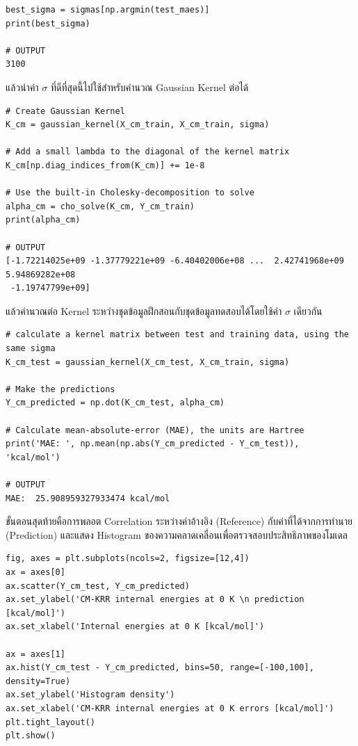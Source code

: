 \begin{lstlisting}[style=MyPython]
best_sigma = sigmas[np.argmin(test_maes)]
print(best_sigma)

# OUTPUT
3100
\end{lstlisting}

\noindent แล้วนำค่า $\sigma$ ที่ดีที่สุดนี้ไปใช้สำหรับคำนวณ Gaussian Kernel ต่อได้

\begin{lstlisting}[style=MyPython]
# Create Gaussian Kernel
K_cm = gaussian_kernel(X_cm_train, X_cm_train, sigma)

# Add a small lambda to the diagonal of the kernel matrix
K_cm[np.diag_indices_from(K_cm)] += 1e-8

# Use the built-in Cholesky-decomposition to solve
alpha_cm = cho_solve(K_cm, Y_cm_train)
print(alpha_cm)

# OUTPUT
[-1.72214025e+09 -1.37779221e+09 -6.40402006e+08 ...  2.42741968e+09  5.94869282e+08
 -1.19747799e+09]
\end{lstlisting}

\noindent แล้วคำนวณต่อ Kernel ระหว่างชุดข้อมูลฝึกสอนกับชุดข้อมูลทดสอบได้โดยใช้ค่า $\sigma$ เดียวกัน

\begin{lstlisting}[style=MyPython]
# calculate a kernel matrix between test and training data, using the same sigma
K_cm_test = gaussian_kernel(X_cm_test, X_cm_train, sigma)

# Make the predictions
Y_cm_predicted = np.dot(K_cm_test, alpha_cm)

# Calculate mean-absolute-error (MAE), the units are Hartree
print('MAE: ', np.mean(np.abs(Y_cm_predicted - Y_cm_test)), 'kcal/mol')

# OUTPUT
MAE:  25.908959327933474 kcal/mol
\end{lstlisting}

ขั้นตอนสุดท้ายคือการพลอต Correlation ระหว่างค่าอ้างอิง (Reference) กับค่าที่ได้จากการทำนาย (Prediction) และแสดง Histogram 
ของความคลาดเคลื่อนเพื่อตรวจสอบประสิทธิภาพของโมเดล

\begin{lstlisting}[style=MyPython]
fig, axes = plt.subplots(ncols=2, figsize=[12,4])
ax = axes[0]
ax.scatter(Y_cm_test, Y_cm_predicted)
ax.set_ylabel('CM-KRR internal energies at 0 K \n prediction [kcal/mol]')
ax.set_xlabel('Internal energies at 0 K [kcal/mol]')

ax = axes[1]
ax.hist(Y_cm_test - Y_cm_predicted, bins=50, range=[-100,100], density=True)
ax.set_ylabel('Histogram density')
ax.set_xlabel('CM-KRR internal energies at 0 K errors [kcal/mol]')
plt.tight_layout()
plt.show()
\end{lstlisting}

